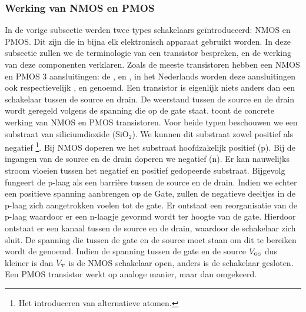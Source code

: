 \subsubsection{Werking van NMOS en PMOS}
\label{ss:nmosPmosWork}
In de vorige subsectie werden twee types schakelaars ge\"introduceerd: NMOS en PMOS. Dit zijn  die in bijna elk elektronisch apparaat gebruikt worden. In deze subsectie zullen we de terminologie van een transistor bespreken, en de werking van deze componenten verklaren. Zoals de meeste transistoren hebben een NMOS en PMOS 3 aansluitingen: de ,  en , in het Nederlands worden deze aansluitingen ook respectievelijk ,  en  genoemd. Een transistor is eigenlijk niets anders dan een schakelaar tussen de source en drain. De weerstand tussen de source en de drain wordt geregeld volgens de spanning die op de gate staat.  toont de concrete werking van NMOS en PMOS transistoren. Voor beide typen beschouwen we een substraat van siliciumdioxide (SiO$_2$). We kunnen dit substraat zowel positief als negatief \footnote{Het introduceren van alternatieve atomen.}. Bij NMOS doperen we het substraat hoofdzakelijk positief (p). Bij de ingangen van de source en de drain doperen we negatief (n). Er kan nauwelijks stroom vloeien tussen het negatief en positief gedopeerde substraat. Bijgevolg fungeert de p-laag als een barri\`ere tussen de source en de drain. Indien we echter een positieve spanning aanbrengen op de Gate, zullen de negatieve deeltjes in de p-laag zich aangetrokken voelen tot de gate. Er ontstaat een reorganisatie van de p-laag waardoor er een n-laagje gevormd wordt ter hoogte van de gate. Hierdoor ontstaat er een kanaal tussen de source en de drain, waardoor de schakelaar zich sluit. De spanning die tussen de gate en de source moet staan om dit te bereiken wordt de  genoemd. Indien de spanning tussen de gate en de source $V_{\mbox{\tiny GS}}$ dus kleiner is dan $V_{\mbox{\tiny T}}$ is de NMOS schakelaar open, anders is de schakelaar gesloten. Een PMOS transistor werkt op analoge manier, maar dan omgekeerd.
